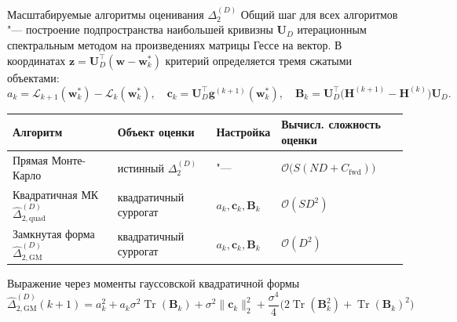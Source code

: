 \documentclass[aspectratio=169]{beamer}
\begin{document}
\begin{frame}{Масштабируемые алгоритмы оценивания $\Delta_2^{(D)}$}
Общий шаг для всех алгоритмов "--- построение подпространства наибольшей кривизны $\mathbf U_D$ итерационным спектральным методом на произведениях матрицы Гессе на вектор. В координатах $\mathbf z = \mathbf U_D^\top (\mathbf w - \mathbf w_k^*)$ критерий определяется тремя сжатыми объектами:
\vspace{-0.2em}
\[
    a_k = \mathcal L_{k+1}(\mathbf w_k^*) - \mathcal L_k(\mathbf w_k^*),
    \quad
    \mathbf c_k = \mathbf U_D^\top \mathbf g^{(k+1)}(\mathbf w_k^*),
    \quad
    \mathbf B_k = \mathbf U_D^\top \big(\mathbf H^{(k+1)} - \mathbf H^{(k)}\big) \mathbf U_D.
\]
\vspace{-1.4em}
\begin{table}[ht]
    \centering
    \footnotesize
    \begin{tabular}{@{}p{3.8cm} p{3.4cm} p{2.2cm} p{4.0cm}@{}}
        \toprule
        Алгоритм & Объект оценки & Настройка & Вычисл. сложность оценки \\
        \midrule
        Прямая Монте-Карло & истинный $\Delta_2^{(D)}$ & "--- & $\mathcal O\bigl(S(ND + C_{\mathrm{fwd}})\bigr)$ \\[0.3em]
        Квадратичная МК~$\widehat \Delta_{2,\mathrm{quad}}^{(D)}$ & квадратичный суррогат & $a_k, \mathbf c_k, \mathbf B_k$ & $\mathcal O(SD^2)$ \\[0.3em]
        Замкнутая форма~$\widehat \Delta_{2,\mathrm{GM}}^{(D)}$ & квадратичный суррогат & $a_k, \mathbf c_k, \mathbf B_k$ & $\mathcal O(D^2)$ \\
        \bottomrule
    \end{tabular}
\end{table}
\vspace{-0.6em}
\begin{block}{Выражение через моменты гауссовской квадратичной формы}
    \vspace{-0.6em}
    \[
        \widehat \Delta_{2,\mathrm{GM}}^{(D)}(k+1) = a_k^2 + a_k \sigma^2 \operatorname{Tr}(\mathbf B_k) + \sigma^2 \|\mathbf c_k\|_2^2 + \dfrac{\sigma^4}{4}\bigl(2\operatorname{Tr}(\mathbf B_k^2) + \operatorname{Tr}(\mathbf B_k)^2\bigr)
    \]
\end{block}
\end{frame}
\end{document}
